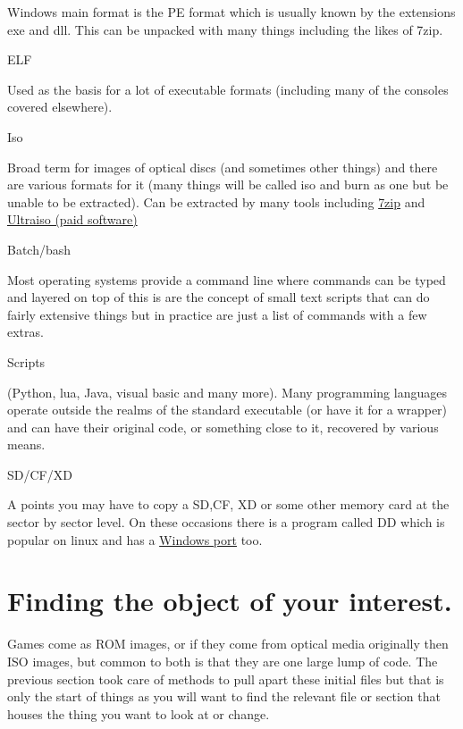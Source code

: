 \documentclass[
]{book}
\begin{document}
Windows main format is the PE format which is usually known by the extensions exe and dll. This can be unpacked with many things including the likes of 7zip.

ELF

Used as the basis for a lot of executable formats (including many of the consoles covered elsewhere).

Iso

Broad term for images of optical discs (and sometimes other things) and there are various formats for it (many things will be called iso and burn as one but be unable to be extracted). Can be extracted by many tools including \href{http://www.7-zip.org/}{7zip} and \href{http://www.ezbsystems.com/ultraiso/}{Ultraiso (paid software)}

Batch/bash

Most operating systems provide a command line where commands can be typed and layered on top of this is are the concept of small text scripts that can do fairly extensive things but in practice are just a list of commands with a few extras.

Scripts

(Python, lua, Java, visual basic and many more). Many programming languages operate outside the realms of the standard executable (or have it for a wrapper) and can have their original code, or something close to it, recovered by various means.

SD/CF/XD

A points you may have to copy a SD,CF, XD or some other memory card at the sector by sector level. On these occasions there is a program called DD which is popular on linux and has a \href{http://www.chrysocome.net/dd}{Windows port} too.

\hypertarget{finding-the-object-of-your-interest.}{%
\section{Finding the object of your interest.}\label{finding-the-object-of-your-interest.}}

Games come as ROM images, or if they come from optical media originally then ISO images, but common to both is that they are one large lump of code. The previous section took care of methods to pull apart these initial files but that is only the start of things as you will want to find the relevant file or section that houses the thing you want to look at or change.
\end{document}

